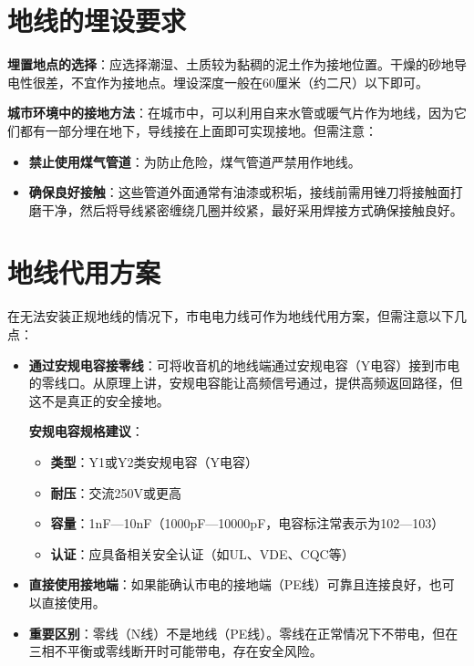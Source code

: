 \documentclass[12pt,UTF8]{ctexbook}
\begin{document}
\section{地线的埋设要求}

\textbf{埋置地点的选择}：应选择潮湿、土质较为黏稠的泥土作为接地位置。干燥的砂地导电性很差，不宜作为接地点。埋设深度一般在60厘米（约二尺）以下即可。

\textbf{城市环境中的接地方法}：在城市中，可以利用自来水管或暖气片作为地线，因为它们都有一部分埋在地下，导线接在上面即可实现接地。但需注意：
\begin{itemize}
	\item \textbf{禁止使用煤气管道}：为防止危险，煤气管道严禁用作地线。
	\item \textbf{确保良好接触}：这些管道外面通常有油漆或积垢，接线前需用锉刀将接触面打磨干净，然后将导线紧密缠绕几圈并绞紧，最好采用焊接方式确保接触良好。
\end{itemize}

\section{地线代用方案}

在无法安装正规地线的情况下，市电电力线可作为地线代用方案，但需注意以下几点：

\begin{itemize}
	\item \textbf{通过安规电容接零线}：可将收音机的地线端通过安规电容（Y电容）接到市电的零线口。从原理上讲，安规电容能让高频信号通过，提供高频返回路径，但这不是真正的安全接地。
	
	\textbf{安规电容规格建议}：
	\begin{itemize}
		\item \textbf{类型}：Y1或Y2类安规电容（Y电容）
		\item \textbf{耐压}：交流250V或更高
		\item \textbf{容量}：1nF—10nF（1000pF—10000pF，电容标注常表示为102—103）
		\item \textbf{认证}：应具备相关安全认证（如UL、VDE、CQC等）
	\end{itemize}
	
	\item \textbf{直接使用接地端}：如果能确认市电的接地端（PE线）可靠且连接良好，也可以直接使用。
	\item \textbf{重要区别}：零线（N线）不是地线（PE线）。零线在正常情况下不带电，但在三相不平衡或零线断开时可能带电，存在安全风险。
\end{itemize}
\end{document}
